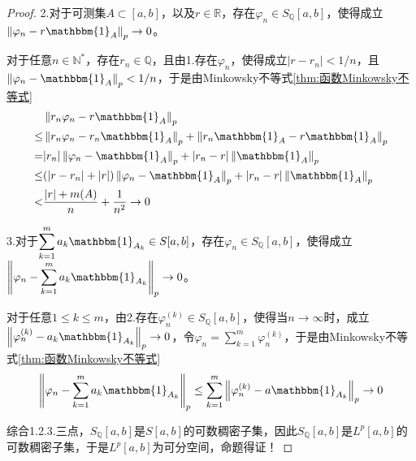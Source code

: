 \documentclass[lang = cn, scheme = chinese, thmcnt = section]{elegantbook}
\newcommand{\R}{\mathbb{R}}            %
\begin{document}
\begin{proof}
	2.对于可测集$A\subset [a,b]$，以及$r\in\R$，存在$\varphi_n\in S_\mathbb{Q}[a,b]$，使得成立$\left\| \varphi_n-r\mathbbm{1}_{A} \right\|_p\to0$。
	
	对于任意$n\in\mathbb{N}^*$，存在$r_n\in\mathbb{Q}$，且由1.存在$\varphi_n$，使得成立$|r-r_n|<1/n$，且$\left\| \varphi_n-\mathbbm{1}_A \right\|_p<1/n$，于是由Minkowsky不等式\ref{thm:函数Minkowsky不等式}
	\begin{align*}
		& \left\| r_n\varphi_n-r\mathbbm{1}_A \right\|_p\\
		\le & \left\| r_n\varphi_n-r_n\mathbbm{1}_A \right\|_p+\left\| r_n\mathbbm{1}_A-r\mathbbm{1}_A \right\|_p\\
		= & |r_n|\left\| \varphi_n-\mathbbm{1}_A \right\|_p+|r_n-r|\left\|\mathbbm{1}_A\right\|_p\\
		\le&(|r-r_n|+|r|)\left\| \varphi_n-\mathbbm{1}_A \right\|_p+|r_n-r|\left\|\mathbbm{1}_A\right\|_p\\
		<&\frac{|r|+m(A)}{n}+\frac{1}{n^2}\to0
	\end{align*}
	
	3.对于$\displaystyle\sum_{k=1}^{m}a_k\mathbbm{1}_{A_k}\in S[a,b]$，存在$\varphi_n\in S_\mathbb{Q}[a,b]$，使得成立$\displaystyle \left\| \varphi_n-\sum_{k=1}^{m}a_k\mathbbm{1}_{A_k} \right\|_p\to 0$。
	
	对于任意$1\le k \le m$，由2.存在$\varphi_n^{(k)}\in S_\mathbb{Q}[a,b]$，使得当$n\to\infty$时，成立$\left\| \varphi_n^{(k)}-a_k\mathbbm{1}_{A_k} \right\|_p\to 0$，令$\displaystyle\varphi_n=\sum_{k=1}^{m}\varphi_n^{(k)}$，于是由Minkowsky不等式\ref{thm:函数Minkowsky不等式}
	$$
	\left\| \varphi_n-\sum_{k=1}^{m}a_k\mathbbm{1}_{A_k} \right\|_p
	\le \sum_{k=1}^{m}\left\| \varphi_n^{(k)}-a\mathbbm{1}_{A_k} \right\|_p \to0
	$$
	
	综合1.2.3.三点，$S_\mathbb{Q}[a,b]$是$S[a,b]$的可数稠密子集，因此$S_\mathbb{Q}[a,b]$是$L^p[a,b]$的可数稠密子集，于是$L^p[a,b]$为可分空间，命题得证！
	

\end{proof}
\end{document}
